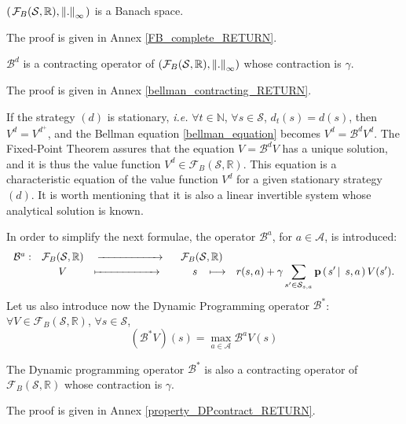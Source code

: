 \begin{theorem}
\label{FB_complete}
$\left( \left. \mathcal{F}_{B}(\mathcal{S},\mathbb{R}),\left\lVert . \right\rVert_{\infty}  \right. \right)$ is a Banach space.
\end{theorem}
The proof is given in Annex \ref{FB_complete_RETURN}.

\begin{Property}
\label{bellman_contracting}
$\mathcal{B}^d$ is a contracting operator of $(\mathcal{F}_{B}(\mathcal{S},\mathbb{R}), \left\lVert . \right\rVert_{\infty})$ 
whose contraction is $\gamma$.
\end{Property}
The proof is given in Annex \ref{bellman_contracting_RETURN}.

If the strategy $(d)$ is stationary,
\textit{i.e.} $\forall t \in \mathbb{N}$,
$\forall s \in \mathcal{S}$, 
$d_t(s) = d(s)$, then
$V^d = V^{d^+}$, and the Bellman equation \ref{bellman_equation}
becomes $V^d = \mathcal{B}^d V^d$.
The Fixed-Point Theorem assures that the
equation $V = \mathcal{B}^d V$ has a unique solution, 
and it is thus the value function 
$V^d \in \mathcal{F}_{B} (\mathcal{S},\mathbb{R})$. 
This equation is a characteristic equation 
of the value function $V^d$
for a given stationary strategy $(d)$. 
It is worth mentioning that it is also a linear invertible
system whose analytical solution is known.

In order to simplify the next formulae,
the operator $\mathcal{B}^a$,
for $a \in \mathcal{A}$, is introduced:
\[ \left. \begin{array}{ccccc}
 \mathcal{B}^a: & \mathcal{F}_{B}(\mathcal{S},\mathbb{R}) & \xrightarrow{\hspace*{2cm}} \hspace{0.5cm} \mathcal{F}_{B}(\mathcal{S},\mathbb{R}) & \\
& V & \xmapsto{\hspace*{2cm}} \hspace{1cm}  s \hspace{0.3cm} \longmapsto & \displaystyle r(s,a) + \gamma \sum_{s' \in \mathcal{S}_{s,a}} \textbf{p} \left( \left. s' \, \right| \left. \, s,a \right. \right)  V(s'). \end{array} \right.  \]
Let us also introduce now the Dynamic Programming operator 
$\mathcal{B}^*$: $\forall V \in \mathcal{F}_{B}(\mathcal{S},\mathbb{R})$, $\forall s \in \mathcal{S}$,
\[ (\mathcal{B}^* V)(s) = \max_{a \in \mathcal{A}} \mathcal{B}^a V (s) \]

\begin{Property}
\label{property_DPcontract}
The Dynamic programming operator $\mathcal{B}^*$ 
is also a contracting operator of 
$\mathcal{F}_{B} (\mathcal{S},\mathbb{R})$ whose contraction is $\gamma$.
\end{Property}
The proof is given in Annex \ref{property_DPcontract_RETURN}.

